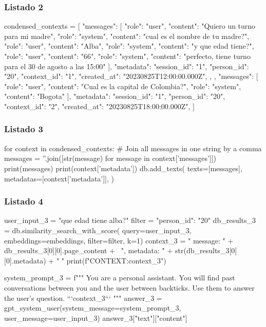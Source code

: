 \subsubsection{Listado 2}
\label{anexo:code-4-1-8-2}

\begin{APACode}
condensed_contexts = [
    {
        "messages": [
            {"role": "user", "content": "Quiero un turno para mi madre"},
            {"role": "system", "content": "cual es el nombre de tu madre?"},
            {"role": "user", "content": "Alba"},
            {"role": "system", "content": "y que edad tiene?"},
            {"role": "user", "content": "66"},
            {"role": "system", 
             "content": "perfecto, tiene turno para el 30 de agosto a las 15:00"}
        ],
        "metadata": {
            "session_id": "1",
            "person_id": "20",
            "context_id": "1",
            "created_at": "20230825T12:00:00.000Z",
        },
    },
    {
        "messages": [
            {"role": "user", "content": "Cual es la capital de Colombia?"},
            {"role": "system", "content": "Bogota"}
        ],
        "metadata": {
            "session_id": "1",
            "person_id": "20",
            "context_id": "2",
            "created_at": "20230825T18:00:00.000Z",
        }
    }
]
\end{APACode}

\subsubsection{Listado 3}
\label{anexo:code-4-1-8-3}

\begin{APACode}
for context in condensed_contexts:
    # Join all messages in one string by a comma
    messages = ''.join([str(message) for message in context['messages']])
    print(messages)
    print(context['metadata'])
    db.add_texts(
        texts=[messages],
        metadatas=[context['metadata']],
    )
\end{APACode}

\subsubsection{Listado 4}
\label{anexo:code-4-1-8-4}

\begin{APACode}
user_input_3 = "que edad tiene alba?"
filter = {"person_id": "20"}
db_results_3 = db.similarity_search_with_score(
    query=user_input_3, embeddings=embeddings, filter=filter, k=1)
context_3 = "{ message: " + db_results_3[0][0].page_content + \
            ", metadata: " + str(db_results_3[0][0].metadata) + " }"
print(f"CONTEXT:{context_3}")

system_prompt_3 = f"""
You are a personal assistant. You will find past conversations between you 
and the user between backticks. Use them to answer the user's question.
```{context_3}```
"""
answer_3 = gpt_system_user(system_message=system_prompt_3, 
                          user_message=user_input_3)
answer_3["text"]["content"]
\end{APACode}


